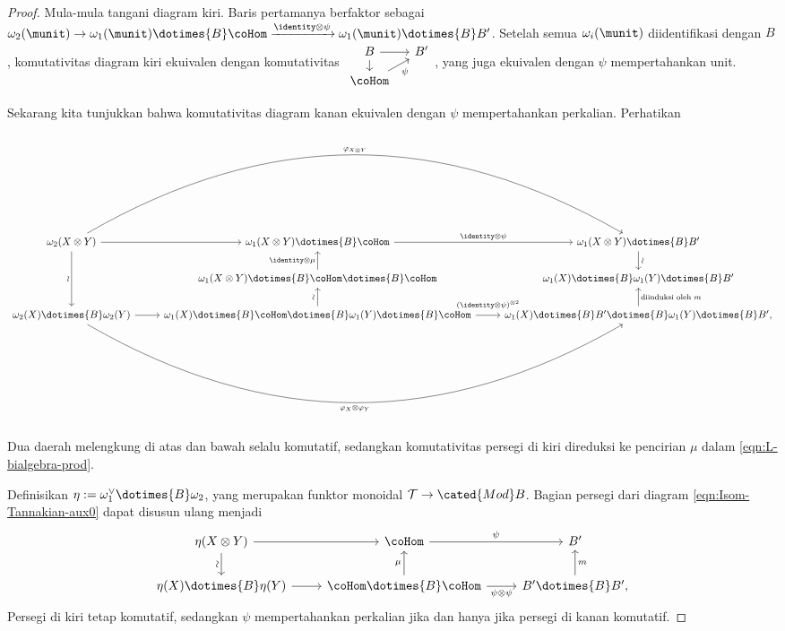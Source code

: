 \begin{proof}
	Mula-mula tangani diagram kiri. Baris pertamanya berfaktor sebagai $\omega_2(\munit)\to\omega_1(\munit)\dotimes{B}\coHom\xrightarrow{\identity\otimes\psi}\omega_1(\munit)\dotimes{B}B'$. Setelah semua $\omega_i(\munit)$ diidentifikasi dengan $B$, komutativitas diagram kiri ekuivalen dengan komutativitas
	$\begin{tikzcd}[column sep=small, row sep=small]
		B \arrow[r] \arrow[d] & B' \\
		\coHom \arrow[ru, "\psi"'] &
	\end{tikzcd}$,
yang juga ekuivalen dengan $\psi$ mempertahankan unit.
	
	Sekarang kita tunjukkan bahwa komutativitas diagram kanan ekuivalen dengan $\psi$ mempertahankan perkalian. Perhatikan
	\begin{equation}\label{eqn:Isom-Tannakian-aux0}
		\begin{tikzcd}
			\omega_2(X \otimes Y) \arrow[rr, bend left, "{\varphi_{X \otimes Y}}"] \arrow[r] \arrow[dd, "\sim"' sloped] & \omega_1(X \otimes Y) \dotimes{B} \coHom \arrow[r, "{\identity \otimes \psi}"] & \omega_1(X \otimes Y) \dotimes{B} B' \arrow[d, "\sim" sloped] \\
			& \omega_1(X \otimes Y) \dotimes{B} \coHom \dotimes{B} \coHom \arrow[u, "{\identity \otimes \mu}"] & \omega_1(X) \dotimes{B} \omega_1(Y) \dotimes{B} B' \\
			\omega_2(X) \dotimes{B} \omega_2(Y) \arrow[rr, bend right, "{\varphi_X \otimes \varphi_Y}"'] \arrow[r] & \omega_1(X) \dotimes{B} \coHom \dotimes{B} \omega_1(Y) \dotimes{B} \coHom \arrow[r, "{(\identity \otimes \psi)^{\otimes 2}}" inner sep=0.6em] \arrow[u, "\sim" sloped] & \omega_1(X) \dotimes{B} B' \dotimes{B} \omega_1(Y) \dotimes{B} B' , \arrow[u, "{\text{diinduksi oleh }m}"']
		\end{tikzcd}
	\end{equation}
Dua daerah melengkung di atas dan bawah selalu komutatif, sedangkan komutativitas persegi di kiri direduksi ke pencirian $\mu$ dalam \eqref{eqn:L-bialgebra-prod}.
	
	Definisikan $\eta:=\omega_1^\vee\dotimes{B}\omega_2$, yang merupakan funktor monoidal $\mathcal{T}\to\cated{Mod}B$. Bagian persegi dari diagram \eqref{eqn:Isom-Tannakian-aux0} dapat disusun ulang menjadi
	\begin{equation}\label{eqn:Isom-Tannakian-aux}
		\begin{tikzcd}
			\eta(X \otimes Y) \arrow[r] \arrow[d, "\sim"' sloped] & \coHom \arrow[r, "\psi"] & B' \\
			\eta(X) \dotimes{B} \eta(Y) \arrow[r] & \coHom \dotimes{B} \coHom \arrow[r, "{\psi \otimes \psi}"'] \arrow[u, "\mu"] & B' \dotimes{B} B' , \arrow[u, "m"']
		\end{tikzcd}
	\end{equation}
Persegi di kiri tetap komutatif, sedangkan $\psi$ mempertahankan perkalian jika dan hanya jika persegi di kanan komutatif.
	

\end{proof}
